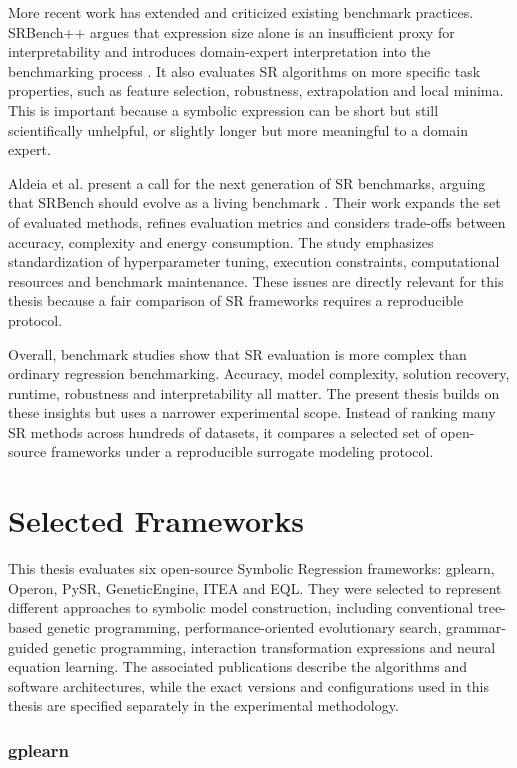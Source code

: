 \documentclass[12pt,oneside,bibtotoc,liststotoc]{scrbook}
\begin{document}
More recent work has extended and criticized existing benchmark practices. SRBench++ argues that expression size alone is an insufficient proxy for interpretability and introduces domain-expert interpretation into the benchmarking process \cite{defranca2025srbench}. It also evaluates SR algorithms on more specific task properties, such as feature selection, robustness, extrapolation and local minima. This is important because a symbolic expression can be short but still scientifically unhelpful, or slightly longer but more meaningful to a domain expert.

Aldeia et al. present a call for the next generation of SR benchmarks, arguing that SRBench should evolve as a living benchmark \cite{aldeia2025call}. Their work expands the set of evaluated methods, refines evaluation metrics and considers trade-offs between accuracy, complexity and energy consumption. The study emphasizes standardization of hyperparameter tuning, execution constraints, computational resources and benchmark maintenance. These issues are directly relevant for this thesis because a fair comparison of SR frameworks requires a reproducible protocol.

Overall, benchmark studies show that SR evaluation is more complex than ordinary regression benchmarking. Accuracy, model complexity, solution recovery, runtime, robustness and interpretability all matter. The present thesis builds on these insights but uses a narrower experimental scope. Instead of ranking many SR methods across hundreds of datasets, it compares a selected set of open-source frameworks under a reproducible surrogate modeling protocol.

\section{Selected Frameworks}

This thesis evaluates six open-source Symbolic Regression frameworks: gplearn, Operon, PySR, GeneticEngine, ITEA and EQL. They were selected to represent different approaches to symbolic model construction, including conventional tree-based genetic programming, performance-oriented evolutionary search, grammar-guided genetic programming, interaction transformation expressions and neural equation learning. The associated publications describe the algorithms and software architectures, while the exact versions and configurations used in this thesis are specified separately in the experimental methodology.

\subsubsection{gplearn}
\end{document}
